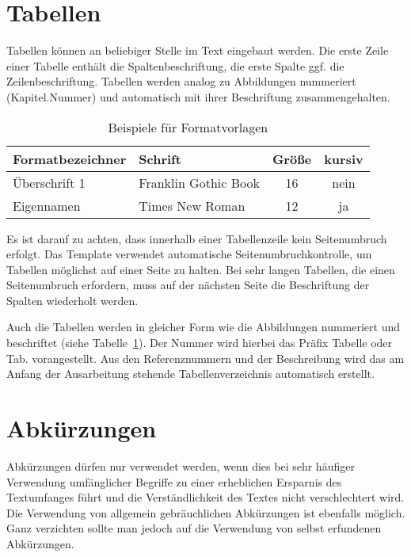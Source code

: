 \section{Tabellen}
\label{sec:tabellen}

Tabellen können an beliebiger Stelle im Text eingebaut werden. Die erste Zeile einer Tabelle enthält die Spaltenbeschriftung, die erste Spalte ggf. die Zeilenbeschriftung. Tabellen werden analog zu Abbildungen nummeriert (Kapitel.Nummer) und automatisch mit ihrer Beschriftung zusammengehalten.

\begin{table}[h]
	\centering
	\caption{Beispiele für Formatvorlagen}
	\label{tab:formatvorlagen}
	\begin{tabular}{|l|l|c|c|}
		\hline
		\textbf{Formatbezeichner} & \textbf{Schrift}     & \textbf{Größe} & \textbf{kursiv} \\
		\hline
		Überschrift 1             & Franklin Gothic Book & 16             & nein            \\
		Eigennamen                & Times New Roman      & 12             & ja              \\
		\hline
	\end{tabular}
\end{table}

Es ist darauf zu achten, dass innerhalb einer Tabellenzeile kein Seitenumbruch erfolgt. Das Template verwendet automatische Seitenumbruchkontrolle, um Tabellen möglichst auf einer Seite zu halten. Bei sehr langen Tabellen, die einen Seitenumbruch erfordern, muss auf der nächsten Seite die Beschriftung der Spalten wiederholt werden.

Auch die Tabellen werden in gleicher Form wie die Abbildungen nummeriert und beschriftet (siehe Tabelle~\ref{tab:formatvorlagen}). Der Nummer wird hierbei das Präfix Tabelle oder Tab. vorangestellt. Aus den Referenznummern und der Beschreibung wird das am Anfang der Ausarbeitung stehende Tabellenverzeichnis automatisch erstellt.

\section{Abkürzungen}
\label{sec:abkuerzungen}

Abkürzungen dürfen nur verwendet werden, wenn dies bei sehr häufiger Verwendung umfänglicher Begriffe zu einer erheblichen Ersparnis des Textumfanges führt und die Verständlichkeit des Textes nicht verschlechtert wird. Die Verwendung von allgemein gebräuchlichen Abkürzungen ist ebenfalls möglich. Ganz verzichten sollte man jedoch auf die Verwendung von selbst erfundenen Abkürzungen.

